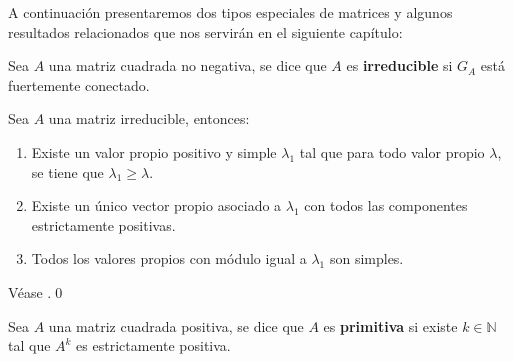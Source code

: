 A continuación presentaremos dos tipos especiales de matrices y algunos resultados relacionados que nos servirán en el siguiente capítulo:
\begin{definition}
Sea $A$ una matriz cuadrada no negativa, se dice que $A$ es \textbf{irreducible} si $G_A$ está fuertemente conectado.
\end{definition}

\begin{theorem} \label{propiedadMatrizIrreducible}
    Sea $A$ una matriz irreducible, entonces:
    \begin{enumerate}
        \item Existe un valor propio positivo y simple  $\lambda_1$ tal que para todo valor propio $\lambda$, se tiene que $\lambda_1\geq\lambda$.
        \item Existe un único vector propio asociado a $\lambda_1$ con todos las componentes estrictamente positivas.
        \item Todos los valores propios con módulo igual a $\lambda_1$ son simples.
    \end{enumerate}
\end{theorem}
\begin{proofs*}
    Véase \cite[Página 263, Teorema 7.13]{Salinelli}.\qed
\end{proofs*}

\begin{definition}
    Sea $A$ una matriz cuadrada positiva, se dice que $A$ es \textbf{primitiva} si existe $k\in\mathbb{N}$ tal que $A^k$ es estrictamente positiva.
\end{definition}

